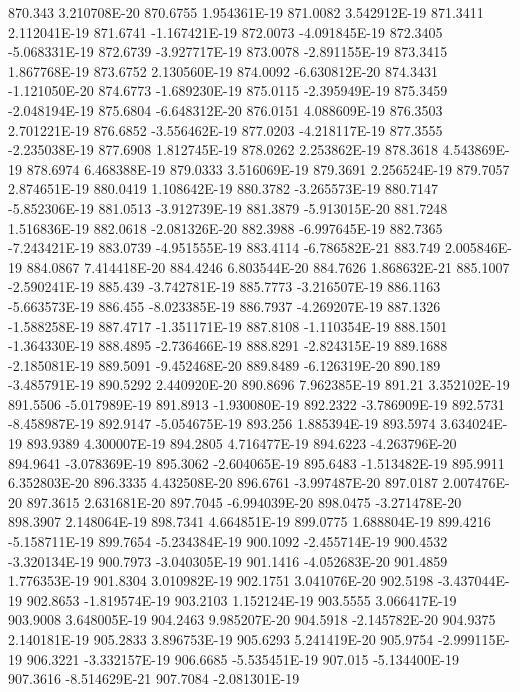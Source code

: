 870.343  3.210708E-20
870.6755  1.954361E-19
871.0082  3.542912E-19
871.3411  2.112041E-19
871.6741  -1.167421E-19
872.0073  -4.091845E-19
872.3405  -5.068331E-19
872.6739  -3.927717E-19
873.0078  -2.891155E-19
873.3415  1.867768E-19
873.6752  2.130560E-19
874.0092  -6.630812E-20
874.3431  -1.121050E-20
874.6773  -1.689230E-19
875.0115  -2.395949E-19
875.3459  -2.048194E-19
875.6804  -6.648312E-20
876.0151  4.088609E-19
876.3503  2.701221E-19
876.6852  -3.556462E-19
877.0203  -4.218117E-19
877.3555  -2.235038E-19
877.6908  1.812745E-19
878.0262  2.253862E-19
878.3618  4.543869E-19
878.6974  6.468388E-19
879.0333  3.516069E-19
879.3691  2.256524E-19
879.7057  2.874651E-19
880.0419  1.108642E-19
880.3782  -3.265573E-19
880.7147  -5.852306E-19
881.0513  -3.912739E-19
881.3879  -5.913015E-20
881.7248  1.516836E-19
882.0618  -2.081326E-20
882.3988  -6.997645E-19
882.7365  -7.243421E-19
883.0739  -4.951555E-19
883.4114  -6.786582E-21
883.749  2.005846E-19
884.0867  7.414418E-20
884.4246  6.803544E-20
884.7626  1.868632E-21
885.1007  -2.590241E-19
885.439  -3.742781E-19
885.7773  -3.216507E-19
886.1163  -5.663573E-19
886.455  -8.023385E-19
886.7937  -4.269207E-19
887.1326  -1.588258E-19
887.4717  -1.351171E-19
887.8108  -1.110354E-19
888.1501  -1.364330E-19
888.4895  -2.736466E-19
888.8291  -2.824315E-19
889.1688  -2.185081E-19
889.5091  -9.452468E-20
889.8489  -6.126319E-20
890.189  -3.485791E-19
890.5292  2.440920E-20
890.8696  7.962385E-19
891.21  3.352102E-19
891.5506  -5.017989E-19
891.8913  -1.930080E-19
892.2322  -3.786909E-19
892.5731  -8.458987E-19
892.9147  -5.054675E-19
893.256  1.885394E-19
893.5974  3.634024E-19
893.9389  4.300007E-19
894.2805  4.716477E-19
894.6223  -4.263796E-20
894.9641  -3.078369E-19
895.3062  -2.604065E-19
895.6483  -1.513482E-19
895.9911  6.352803E-20
896.3335  4.432508E-20
896.6761  -3.997487E-20
897.0187  2.007476E-20
897.3615  2.631681E-20
897.7045  -6.994039E-20
898.0475  -3.271478E-20
898.3907  2.148064E-19
898.7341  4.664851E-19
899.0775  1.688804E-19
899.4216  -5.158711E-19
899.7654  -5.234384E-19
900.1092  -2.455714E-19
900.4532  -3.320134E-19
900.7973  -3.040305E-19
901.1416  -4.052683E-20
901.4859  1.776353E-19
901.8304  3.010982E-19
902.1751  3.041076E-20
902.5198  -3.437044E-19
902.8653  -1.819574E-19
903.2103  1.152124E-19
903.5555  3.066417E-19
903.9008  3.648005E-19
904.2463  9.985207E-20
904.5918  -2.145782E-20
904.9375  2.140181E-19
905.2833  3.896753E-19
905.6293  5.241419E-20
905.9754  -2.999115E-19
906.3221  -3.332157E-19
906.6685  -5.535451E-19
907.015  -5.134400E-19
907.3616  -8.514629E-21
907.7084  -2.081301E-19
